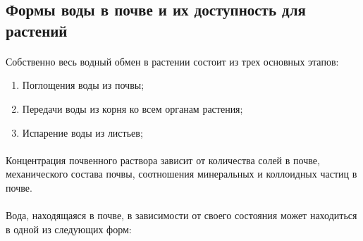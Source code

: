 \subsection*{Формы воды в почве и их доступность для растений}

\paragraph{}Собственно весь водный обмен в растении состоит из трех основных этапов:

\begin{enumerate}

	\item Поглощения воды из почвы;
	\item Передачи воды из корня ко всем органам растения; 
	\item Испарение воды из листьев;

\end{enumerate}
 


	
\paragraph{}Концентрация почвенного раствора зависит от количества солей в почве, механического состава почвы, соотношения минеральных и коллоидных частиц в почве. 

\paragraph{}Вода, находящаяся в почве, в зависимости от своего состояния может находиться в одной из следующих форм:

